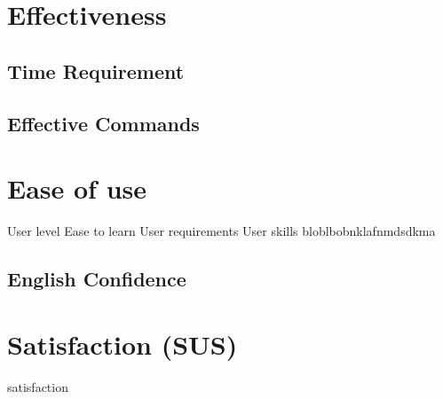 \section{Effectiveness} 
\subsection{Time Requirement}
\subsection{Effective Commands}

\section{Ease of use}
User level
Ease to learn
User requirements
User skills
bloblbobnklafnmdsdkma
\subsection{English Confidence}

\section{Satisfaction (SUS)}
satisfaction